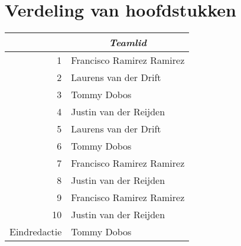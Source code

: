\section{Verdeling van hoofdstukken}
\begin{table}[h]
\begin{tabular}{|r|l|}
\hline
\rowcolor[HTML]{9B9B9B} 
\multicolumn{1}{|c|}{\cellcolor[HTML]{9B9B9B}\textit{\textbf{Hoofdstuk}}} & \multicolumn{1}{c|}{\cellcolor[HTML]{9B9B9B}\textit{\textbf{Teamlid}}} \\ \hline
\rowcolor[HTML]{EFEFEF} 
1 & Francisco Ramirez Ramirez \\ \hline
2 & Laurens van der Drift \\ \hline
\rowcolor[HTML]{EFEFEF} 
3 & Tommy Dobos \\ \hline
4 & Justin van der Reijden \\ \hline
\rowcolor[HTML]{EFEFEF} 
5 & Laurens van der Drift \\ \hline
6 & Tommy Dobos \\ \hline
\rowcolor[HTML]{EFEFEF} 
7 & Francisco Ramirez Ramirez \\ \hline
8 & Justin van der Reijden \\ \hline
\rowcolor[HTML]{EFEFEF} 
9 & Francisco Ramirez Ramirez \\ \hline
10 & Justin van der Reijden \\ \hline
\rowcolor [HTML]{EFEFEF}
Eindredactie & Tommy Dobos \\ \hline
\end{tabular}
\end{table}